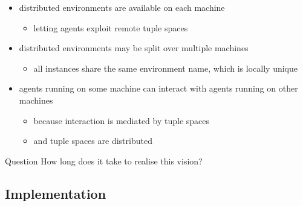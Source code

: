 \documentclass[presentation]{beamer}\mode<presentation>{\usetheme{AMSCesenaPurpleAndGold}}
\begin{document}
\begin{frame}[allowframebreaks]
\begin{itemize}
		\medskip
		
		\item distributed \alert{environments} are available on each machine
		\begin{itemize}
			\item letting agents exploit \alert{remote} tuple spaces
		\end{itemize}

		\medskip

		\item distributed environments may be split over multiple machines
		\begin{itemize}
			\item all instances share the same \alert{environment name}, which is locally unique
		\end{itemize}

		\medskip

		\item agents running on some machine \alert{can interact} with agents running on other machines
		\begin{itemize}
			\item because interaction is \alert{mediated} by tuple spaces
			\item and tuple spaces are \alert{distributed}
		\end{itemize}  
	\end{itemize}

	\framebreak

	\begin{alertblock}{Question}\centering
		How long does it take to realise this vision?
	\end{alertblock}
\end{frame}

\subsection{Implementation}
\end{document}
